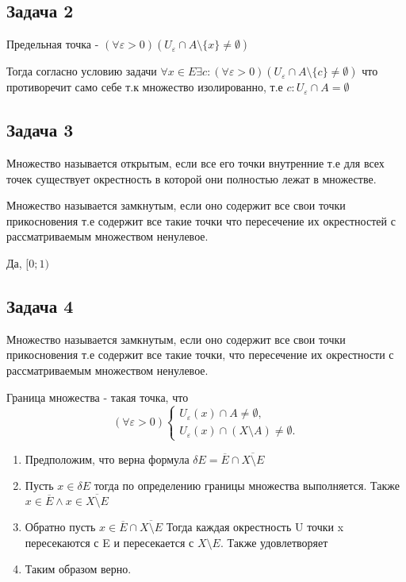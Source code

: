 \documentclass[a4paper,12pt]{article}
\begin{document}
\subsection{Задача 2}

Предельная точка - $(\forall \varepsilon > 0) (U_{\varepsilon}\cap A\setminus \{x\} \ne \emptyset)$

Тогда согласно условию задачи $\forall x \in E \exists c: (\forall \varepsilon > 0) (U_{\varepsilon}\cap A\setminus \{c\} \ne \emptyset)$ что противоречит само себе т.к множество изолированно, т.е $c: U_{\varepsilon} \cap A = \emptyset$


\subsection{Задача 3}
Множество называется открытым, если все его точки внутренние т.е для всех точек существует окрестность в которой они полностью лежат в множестве.

Множество называется замкнутым, если оно содержит все свои точки прикосновения т.е содержит все такие точки что пересечение их окрестностей с рассматриваемым множеством ненулевое.

Да, $[0;1)$

\subsection{Задача 4}

Множество называется замкнутым, если оно содержит все свои точки прикосновения т.е содержит все такие точки, что пересечение их окрестности с рассматриваемым множеством ненулевое.

Граница множества - такая точка, что 
    \[
    (\forall \varepsilon > 0) 
    \begin{cases}
        U_{\varepsilon}(x) \cap A \ne \emptyset, \\ 
        U_{\varepsilon}(x) \cap (X\setminus A) \ne \emptyset.
    \end{cases}
    \]

\begin{enumerate}
    \item Предположим, что верна формула $\delta E = \overline{E} \cap \overline{X \setminus E}$
    \item Пусть $x \in \delta E$ тогда по определению границы множества выполняется. Также $x \in \overline{E} \land x \in \overline{X \setminus E}$
    \item Обратно пусть $x \in \overline{E} \cap \overline{X \setminus E}$ Тогда каждая окрестность U точки x пересекаются с E и пересекается с $X \setminus E$. Также удовлетворяет
    \item Таким образом верно.
\end{enumerate}
\end{document}
